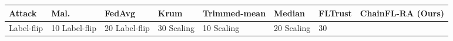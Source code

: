 \begin{tabular}{llllllll}
\toprule
Attack & Mal. & FedAvg & Krum & Trimmed-mean & Median & FLTrust & ChainFL-RA (Ours) \\
\midrule
Label-flip & 10%
Label-flip & 20%
Label-flip & 30%
Scaling & 10%
Scaling & 20%
Scaling & 30%
\bottomrule
\end{tabular}
